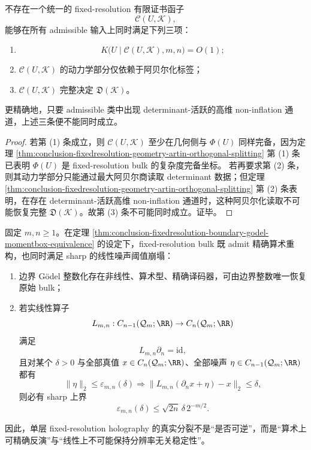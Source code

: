 \begin{corollary}[普适阿贝尔化有限压缩证书不存在]\label{cor:conclusion-fixedresolution-no-universal-abelianized-finite-certificate}
不存在一个统一的 fixed-resolution 有限证书函子
\[
\mathcal C(U,\mathcal K),
\]
能够在所有 admissible 输入上同时满足下列三项：
\begin{enumerate}
  \item
        \[
        K\bigl(U\mid \mathcal C(U,\mathcal K),m,n\bigr)=O(1);
        \]
  \item \(\mathcal C(U,\mathcal K)\) 的动力学部分仅依赖于阿贝尔化标签；
  \item \(\mathcal C(U,\mathcal K)\) 完整决定 \(\mathfrak D(\mathcal K)\)。
\end{enumerate}
更精确地，只要 admissible 类中出现 determinant-活跃的高维 non-inflation 通道，上述三条便不能同时成立。
\end{corollary}
\begin{proof}
若第 (1) 条成立，则 \(\mathcal C(U,\mathcal K)\) 至少在几何侧与 \(\Phi(U)\) 同样完备，因为定理 \ref{thm:conclusion-fixedresolution-geometry-artin-orthogonal-splitting} 第 (1) 条已表明 \(\Phi(U)\) 是 fixed-resolution bulk 的复杂度完备坐标。
若再要求第 (2) 条，则其动力学部分只能通过最大阿贝尔商读取 determinant 数据；但定理 \ref{thm:conclusion-fixedresolution-geometry-artin-orthogonal-splitting} 第 (2) 条表明，在存在 determinant-活跃高维 non-inflation 通道时，这种阿贝尔化读取不可能恢复完整 \(\mathfrak D(\mathcal K)\)。故第 (3) 条不可能同时成立。证毕。
\end{proof}

\begin{theorem}[固定分辨率精确全息的完备性与指数不稳定性的分裂]\label{thm:conclusion-fixedresolution-exact-completeness-exponential-instability}
固定 \(m,n\ge 1\)。在定理 \ref{thm:conclusion-fixedresolution-boundary-godel-momentbox-equivalence} 的设定下，fixed-resolution bulk 既 admit 精确算术重构，也同时满足 sharp 的线性噪声阈值崩塌：
\begin{enumerate}
  \item 边界 Gödel 整数化存在非线性、算术型、精确译码器，可由边界整数唯一恢复原始 bulk；
  \item 若实线性算子
        \[
        L_{m,n}:C_{n-1}(\mathcal Q_m;\RR)\to C_n(\mathcal Q_m;\RR)
        \]
        满足
        \[
        L_{m,n}\partial_n=\mathrm{id},
        \]
        且对某个 \(\delta>0\) 与全部真值 \(x\in C_n(\mathcal Q_m;\RR)\)、全部噪声 \(\eta\in C_{n-1}(\mathcal Q_m;\RR)\) 都有
        \[
        \|\eta\|_2\le \varepsilon_{m,n}(\delta)
        \Longrightarrow
        \|L_{m,n}(\partial_nx+\eta)-x\|_2\le \delta,
        \]
        则必有 sharp 上界
        \[
        \varepsilon_{m,n}(\delta)\le \sqrt{2n}\,\delta\,2^{-m/2}.
        \]
\end{enumerate}
因此，单层 fixed-resolution holography 的真实分裂不是“是否可逆”，而是“算术上可精确反演”与“线性上不可能保持分辨率无关稳定性”。
\end{theorem}

